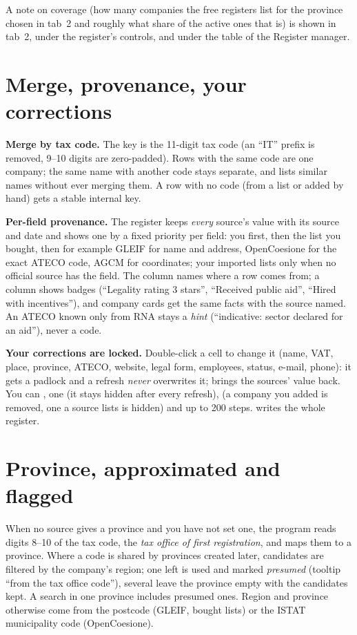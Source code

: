 A note on coverage (how many companies the free registers list for the province chosen in tab~2 and roughly what share of the active ones that is) is shown in tab~2, under the register's controls, and under the table of the Register manager.

\section{Merge, provenance, your corrections}
\textbf{Merge by tax code.} The key is the 11-digit tax code (an ``IT'' prefix is removed,
9--10 digits are zero-padded). Rows with the same code are one company; the same name with
another code stays separate, and  lists similar names without ever
merging them. A row with no code (from a list or added by hand) gets a stable internal key.

\textbf{Per-field provenance.} The register keeps \emph{every} source's value with its
source and date and shows one by a fixed priority per field: you first, then the list you
bought, then for example GLEIF for name and address, OpenCoesione for the exact ATECO code,
AGCM for coordinates; your imported lists only when no official source has the field. The
 column names where a row comes from; a  column shows badges (``Legality
rating 3 stars'', ``Received public aid'', ``Hired with incentives''), and company cards get the
same facts with the source named. An ATECO known only from RNA stays a \emph{hint}
(``indicative: sector declared for an aid''), never a code.

\textbf{Your corrections are locked.} Double-click a cell to change it (name, VAT, place,
province, ATECO, website, legal form, employees, status, e-mail, phone): it gets a
padlock and a refresh \emph{never} overwrites it;  brings the sources' value
back. You can ,  one (it stays hidden after every refresh),
 (a company you added is removed, one a source lists is hidden) and  up to
200 steps.  writes the whole register.

\section{Province, approximated and flagged}
When no source gives a province and you have not set one, the program reads digits 8--10 of
the tax code, the \emph{tax office of first registration}, and maps them to a province. Where
a code is shared by provinces created later, candidates are filtered by the company's region;
one left is used and marked \emph{presumed} (tooltip ``from the tax office code''), several
leave the province empty with the candidates kept. A search in one province includes presumed
ones. Region and province otherwise come from the postcode (GLEIF, bought lists) or the ISTAT
municipality code (OpenCoesione).

